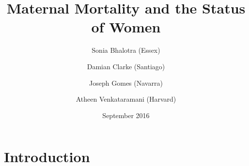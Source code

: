 \documentclass[9pt,letterpaper,subeqn]{beamer}
\title{Maternal Mortality and the Status of Women}
\author[Bhalotra et al.]{Sonia Bhalotra (Essex)
    \and Damian Clarke (Santiago) \\ \vspace{1mm}
    \and Joseph Gomes (Navarra)
    \and Atheen Venkataramani (Harvard)}
\date{September 2016}
\begin{document}
\begin{frame}
\titlepage
\end{frame}

\section{Introduction}
%
\end{document}
